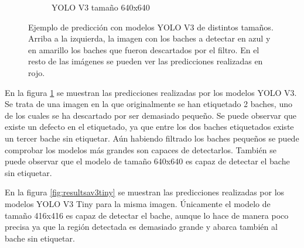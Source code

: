 \begin{figure}[H]
\begin{subfigure}[h]{0.45\linewidth}
		\caption{YOLO V3 tamaño 640x640}
	\end{subfigure}
	\caption{Ejemplo de predicción con modelos YOLO V3 de distintos tamaños. Arriba a la izquierda, la imagen con los baches a detectar en azul y en amarillo los baches que fueron descartados por el filtro. En el resto de las imágenes se pueden ver las predicciones realizadas en rojo.}
	\label{fig:resultsav3}
\end{figure}

En la figura \ref{fig:resultsav3} se muestran las predicciones realizadas por los modelos YOLO V3. Se trata de una imagen en la que originalmente se han etiquetado 2 baches, uno de los cuales se ha descartado por ser demasiado pequeño. Se puede observar que existe un defecto en el etiquetado, ya que entre los dos baches etiquetados existe un tercer bache sin etiquetar. Aún habiendo filtrado los baches pequeños se puede comprobar los modelos más grandes son capaces de detectarlos. También se puede observar que el modelo de tamaño 640x640 es capaz de detectar el bache sin etiquetar.

En la figura \ref{fig:resultsav3tiny} se muestran las predicciones realizadas por los modelos YOLO V3 Tiny para la misma imagen. Únicamente el modelo de tamaño 416x416 es capaz de detectar el bache, aunque lo hace de manera poco precisa ya que la región detectada es demasiado grande y abarca también al bache sin etiquetar.

